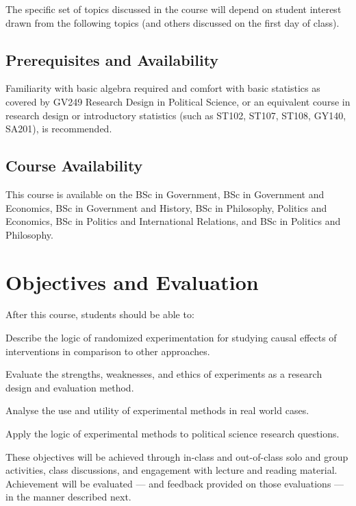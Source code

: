 \documentclass[12pt,a4paper]{article}
\begin{document}
\noindent The specific set of topics discussed in the course will depend on student interest drawn from the following topics (and others discussed on the first day of class).

\subsection*{Prerequisites and Availability}

Familiarity with basic algebra required and comfort with basic statistics as covered by GV249 Research Design in Political Science, or an equivalent course in research design or introductory statistics (such as ST102, ST107, ST108, GY140, SA201), is recommended.

\subsection*{Course Availability}

This course is available on the BSc in Government, BSc in Government and Economics, BSc in Government and History, BSc in Philosophy, Politics and Economics, BSc in Politics and International Relations, and BSc in Politics and Philosophy.

\section{Objectives and Evaluation}

After this course, students should be able to:

\begin{enumerate*}
\item Describe the logic of randomized experimentation for studying causal effects of interventions in comparison to other approaches.
\item Evaluate the strengths, weaknesses, and ethics of experiments as a research design and evaluation method.
\item Analyse the use and utility of experimental methods in real world cases.
\item Apply the logic of experimental methods to political science research questions.
\end{enumerate*}

\noindent These objectives will be achieved through in-class and out-of-class solo and group activities, class discussions, and engagement with lecture and reading material. Achievement will be evaluated --- and feedback provided on those evaluations --- in the manner described next.
\end{document}
